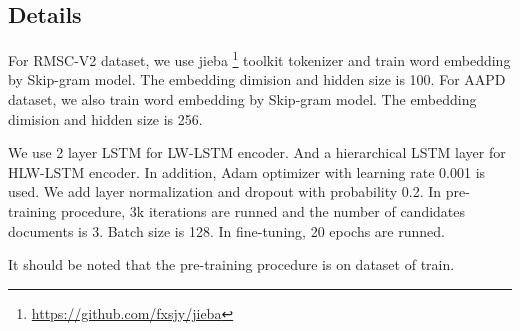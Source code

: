 \documentclass[runningheads]{llncs}
\begin{document}
\subsection{Details}
For RMSC-V2 dataset, we use jieba \footnote{\url{https://github.com/fxsjy/jieba}} toolkit tokenizer and train word embedding by Skip-gram model\cite{mikolov2013distributed}. The embedding dimision and hidden size is 100. For AAPD dataset, we also train word embedding by Skip-gram model\cite{mikolov2013distributed}. The embedding dimision and hidden size is 256. 

We use 2 layer LSTM for LW-LSTM encoder. And a hierarchical LSTM layer for HLW-LSTM encoder. In addition, Adam\cite{kingma2014adam} optimizer with learning rate 0.001 is used. We add layer normalization\cite{ba2016layer} and dropout with probability 0.2. In pre-training procedure, 3k iterations are runned and the number of candidates documents is 3. Batch size is 128. In fine-tuning, 20 epochs are runned.

It should be noted that the pre-training procedure is on dataset of train. 
\end{document}
